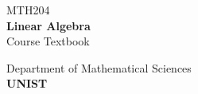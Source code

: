 \documentclass[11pt, a4paper, oneside]{book}
\begin{document}
\frontmatter
\begin{titlepage}
    \centering
    \vspace*{6cm}
    
    {\LARGE MTH204}
    \\[0.5cm]
    {\Huge\bfseries Linear Algebra}
    \\[1.5cm]
    {\LARGE Course Textbook}

    \vfill

    {\Large Department of Mathematical Sciences}
    \\[0.4cm]
    {\Large\bfseries UNIST}
\end{titlepage}

\clearpage
\thispagestyle{empty}

\begin{flushright}
\end{flushright}
\end{document}
